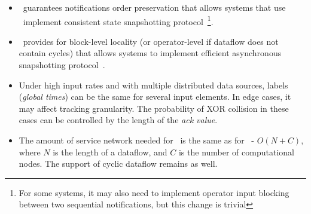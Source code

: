 \begin{itemize}
    \item \tracker\ guarantees notifications order preservation that allows systems that use \tracker\ implement consistent state snapshotting protocol~\footnote{For some systems, it may also need to implement operator input blocking between two sequential notifications, but this change is trivial}.
    \item \tracker\ provides for block-level locality (or operator-level if dataflow does not contain cycles) that allows systems to implement efficient asynchronous snapshotting protocol~\cite{Carbone:2017:SMA:3137765.3137777}.
    \item Under high input rates and with multiple distributed data sources, labels (\textit{global times}) can be the same for several input elements. In edge cases, it may affect tracking granularity. The probability of XOR collision in these cases can be controlled by the length of the \textit{ack value}.
    \item The amount of service network needed for \tracker\ is the same as for \acker\ - $O(N+C)$, where $N$ is the length of a dataflow, and $C$ is the number of computational nodes. The support of cyclic dataflow remains as well.
\end{itemize}






